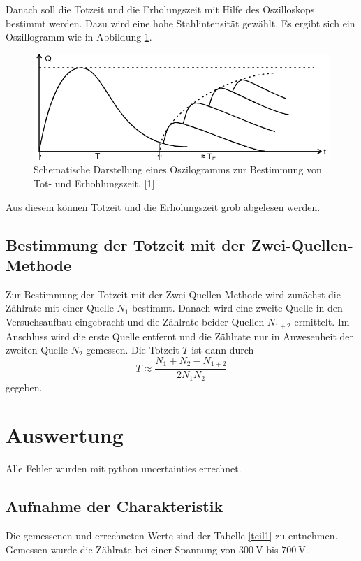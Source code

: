 \documentclass[11pt,ngerman,a4paper]{article}
\begin{document}
\noindent
Danach soll die Totzeit und die Erholungszeit mit Hilfe des Oszilloskops bestimmt werden. Dazu wird eine hohe Stahlintensität gewählt. Es ergibt sich ein Oszillogramm wie in Abbildung \ref{abb5}.
\begin{figure}[htp]
\centering
\includegraphics[scale=0.55]{abb5.png}
\caption{Schematische Darstellung eines Oszilogramms zur Bestimmung von Tot- und Erhohlungszeit. [1]}
\label{abb5}
\end{figure}
Aus diesem können Totzeit und die Erholungszeit grob abgelesen werden.
\subsection{Bestimmung der Totzeit mit der Zwei-Quellen-Methode}
Zur Bestimmung der Totzeit mit der Zwei-Quellen-Methode wird zunächst die Zählrate mit einer Quelle $N_1$ bestimmt. Danach wird eine zweite Quelle in den Versuchsaufbau eingebracht und die Zählrate beider Quellen $N_{1+2}$ ermittelt. Im Anschluss wird die erste Quelle entfernt und die Zählrate nur in Anwesenheit der zweiten Quelle $N_2$ gemessen. Die Totzeit $T$ ist dann durch 
\[
T \approx \frac{N_1 + N_2 - N_{1+2}}{2N_1N_2}
\]
gegeben.
 
\section{Auswertung}
Alle Fehler wurden mit python uncertainties errechnet.
\subsection{Aufnahme der Charakteristik}
Die gemessenen und errechneten Werte sind der Tabelle \ref{teil1} zu entnehmen. Gemessen wurde die Zählrate bei einer Spannung von $\SI{300}{\volt}$ bis $\SI{700}{\volt}$.
\end{document}
